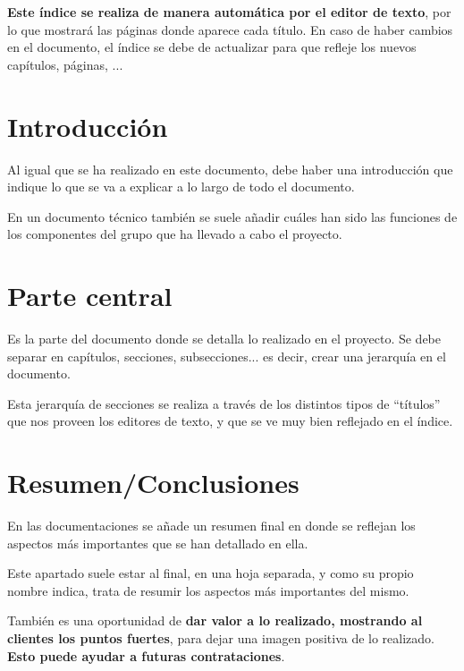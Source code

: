 \textbf{Este índice se realiza de manera automática por el editor de texto}, por lo que mostrará las páginas donde aparece cada título. En caso de haber cambios en el documento, el índice se debe de actualizar para que refleje los nuevos capítulos, páginas, ...


\section{Introducción}
Al igual que se ha realizado en este documento, debe haber una introducción que indique lo que se va a explicar a lo largo de todo el documento.

En un documento técnico también se suele añadir cuáles han sido las funciones de los componentes del grupo que ha llevado a cabo el proyecto.

\section{Parte central}
Es la parte del documento donde se detalla lo realizado en el proyecto. Se debe separar en capítulos, secciones, subsecciones... es decir, crear una jerarquía en el documento.

Esta jerarquía de secciones se realiza a través de los distintos tipos de “títulos” que nos proveen los editores de texto, y que se ve muy bien reflejado en el índice.


\section{Resumen/Conclusiones}
En las documentaciones se añade un resumen final en donde se reflejan los aspectos más importantes que se han detallado en ella.

Este apartado suele estar al final, en una hoja separada, y como su propio nombre indica, trata de resumir los aspectos más importantes del mismo.

También es una oportunidad de \textbf{dar valor a lo realizado, mostrando al clientes los puntos fuertes}, para dejar una imagen positiva de lo realizado. \textbf{Esto puede ayudar a futuras contrataciones}.